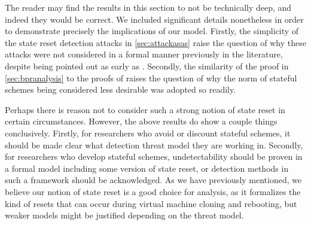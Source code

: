 The reader may find the results in this section to not be technically deep, and indeed they would be correct. We included significant details nonetheless in order to demonstrate precisely the implications of our model. Firstly, the simplicity of the state reset detection attacks in \autoref{sec:attackasas} raise the question of why these attacks were not considered in a formal manner previously in the literature, despite being pointed out as early as \cite{CCS:BelJaeKan15}. Secondly, the similarity of the proof in \autoref{sec:bpranalysis} to the proofs of \cite{CCS:BelJaeKan15} raises the question of why the norm of stateful schemes being considered less desirable was adopted so readily.

Perhaps there is reason not to consider such a strong notion of state reset in certain circumstances. However, the above results do show a couple things conclusively. Firstly, for researchers who avoid or discount stateful schemes, it should be made clear what detection threat model they are working in. Secondly, for researchers who develop stateful schemes, undetectability should be proven in a formal model including some version of state reset, or detection methods in such a framework should be acknowledged. As we have previously mentioned, we believe our notion of state reset is a good choice for analysis, as it formalizes the kind of resets that can occur during virtual machine cloning and rebooting, but weaker models might be justified depending on the threat model.
